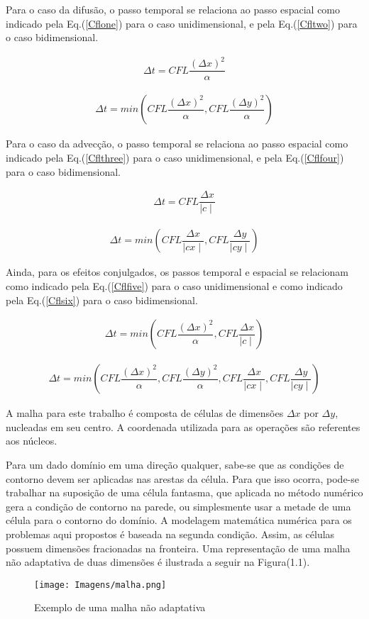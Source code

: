 	Para o caso da difusão, o passo temporal se relaciona ao passo espacial como indicado pela Eq.(\ref{Cflone}) para o caso unidimensional, e pela Eq.(\ref{Cfltwo}) para o caso bidimensional.
	
\begin{align}
\label{Cflone}
\Delta t = CFL \dfrac{(\Delta x)^2}{\alpha}
\end{align}

\begin{align}
\label{Cfltwo}
\Delta t = min \left(CFL \dfrac{(\Delta x)^2}{\alpha} , CFL \dfrac{(\Delta y)^2}{\alpha}\right)
\end{align}

	Para o caso da advecção, o passo temporal se relaciona ao passo espacial como indicado pela Eq.(\ref{Cflthree}) para o caso unidimensional, e pela Eq.(\ref{Cflfour}) para o caso bidimensional.
	
\begin{align}
\label{Cflthree}
\Delta t = CFL \dfrac{\Delta x}{\mid c \mid}
\end{align}

\begin{align}
\label{Cflfour}
\Delta t = min \left(CFL \dfrac{\Delta x}{\mid cx \mid}, CFL \dfrac{\Delta y}{\mid cy \mid}\right)
\end{align}

	Ainda, para os efeitos conjulgados, os passos temporal e espacial se relacionam como indicado pela Eq.(\ref{Cflfive}) para o caso unidimensional e como indicado pela Eq.(\ref{Cflsix}) para o caso bidimensional.
	
\begin{align}
\label{Cflfive}
\Delta t = min \left(CFL \dfrac{(\Delta x)^2}{\alpha}, CFL \dfrac{\Delta x}{\mid c \mid}\right)
\end{align}

\begin{align}
\label{Cflsix}
\Delta t = min \left(CFL \dfrac{(\Delta x)^2}{\alpha} , CFL \dfrac{(\Delta y)^2}{\alpha}, CFL \dfrac{\Delta x}{\mid cx \mid}, CFL \dfrac{\Delta y}{\mid cy \mid}\right)
\end{align}

	A malha para este trabalho é composta de células de dimensões $\Delta x$ por $\Delta y$, nucleadas em seu centro. A coordenada utilizada para as operações são referentes aos núcleos. 
	
Para um dado domínio em uma direção qualquer, sabe-se que as condições de contorno devem ser aplicadas nas arestas da célula. Para que isso ocorra, pode-se trabalhar na suposição de uma célula fantasma, que aplicada no método numérico gera a condição de contorno na parede, ou simplesmente usar a metade de uma célula para o contorno do domínio. A modelagem matemática numérica para os problemas aqui propostos é baseada na segunda condição. Assim, as células possuem dimensões fracionadas na fronteira.
	Uma representação de uma malha não adaptativa de duas dimensões é ilustrada a seguir na Figura(1.1).
\newline
\newline	

\begin{figure}[ht!]
	\label{malhim}
	\centering
	\texttt{[image: Imagens/malha.png]}
	\caption{Exemplo de uma malha não adaptativa}
\end{figure}